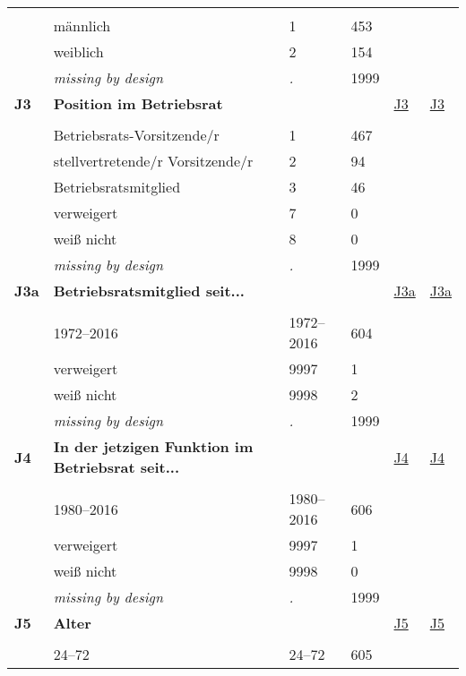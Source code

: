 \begin{longtable}{| L{2.45cm} | L{6cm} | C{1.5cm} | R{1cm} | C{2.25cm} | C{2.25cm} |}
   &  &  &  &  &  \\ 
   & männlich & 1 & 453 &  &  \\ 
   & weiblich & 2 & 154 &  &  \\ 
   & \textit{missing by design} & \textit{.} & 1999 &  &  \\ 
   \midrule
\textbf{J3}\label{var:J3} & \textbf{Position im Betriebsrat} &  &  & \hyperref[J3]{J3} & \hyperref[var:suf:J3]{J3} \\ 
   &  &  &  &  &  \\ 
   & Betriebsrats-Vorsitzende/r & 1 & 467 &  &  \\ 
   & stellvertretende/r Vorsitzende/r & 2 & 94 &  &  \\ 
   & Betriebsratsmitglied & 3 & 46 &  &  \\ 
   & verweigert & 7 & 0 &  &  \\ 
   & weiß nicht & 8 & 0 &  &  \\ 
   & \textit{missing by design} & \textit{.} & 1999 &  &  \\ 
   \midrule
\textbf{J3a}\label{var:J3a} & \textbf{Betriebsratsmitglied seit...} &  &  & \hyperref[J3a]{J3a} & \hyperref[var:suf:J3a]{J3a} \\ 
   &  &  &  &  &  \\ 
   & 1972--2016 & 1972--2016 & 604 &  &  \\ 
   & verweigert & 9997 & 1 &  &  \\ 
   & weiß nicht & 9998 & 2 &  &  \\ 
   & \textit{missing by design} & \textit{.} & 1999 &  &  \\ 
   \midrule
\textbf{J4}\label{var:J4} & \textbf{In der jetzigen Funktion im Betriebsrat seit...} &  &  & \hyperref[J4]{J4} & \hyperref[var:suf:J4]{J4} \\ 
   &  &  &  &  &  \\ 
   & 1980--2016 & 1980--2016 & 606 &  &  \\ 
   & verweigert & 9997 & 1 &  &  \\ 
   & weiß nicht & 9998 & 0 &  &  \\ 
   & \textit{missing by design} & \textit{.} & 1999 &  &  \\ 
   \midrule
\textbf{J5}\label{var:J5} & \textbf{Alter} &  &  & \hyperref[J5]{J5} & \hyperref[var:suf:J5]{J5} \\ 
   &  &  &  &  &  \\ 
   & 24--72 & 24--72 & 605 &  &  \\ 

\end{longtable}
